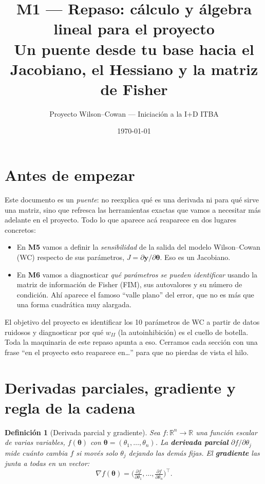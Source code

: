 \documentclass[11pt,a4paper]{article}
\title{\textbf{M1 --- Repaso: cálculo y álgebra lineal para el proyecto}\\[2pt]\large Un puente desde tu base hacia el Jacobiano, el Hessiano y la matriz de Fisher}
\author{Proyecto Wilson--Cowan --- Iniciación a la I+D ITBA}
\date{\today}
\newtheorem{definition}{Definición}
\newcommand{\R}{\mathbb{R}}
\newcommand{\thetavec}{\bm{\theta}}
\newcommand{\transp}{^{\top}}
\begin{document}
\maketitle
\tableofcontents
\bigskip

\section*{Antes de empezar}

Este documento es un \emph{puente}: no reexplica qué es una derivada ni para qué sirve una matriz, sino que refresca las herramientas exactas que vamos a necesitar más adelante en el proyecto. Todo lo que aparece acá reaparece en dos lugares concretos:

\begin{itemize}[nosep]
  \item En \textbf{M5} vamos a definir la \emph{sensibilidad} de la salida del modelo Wilson--Cowan (WC) respecto de sus parámetros, $J=\partial \mathbf{y}/\partial\thetavec$. Eso es un Jacobiano.
  \item En \textbf{M6} vamos a diagnosticar \emph{qué parámetros se pueden identificar} usando la matriz de información de Fisher (FIM), sus autovalores y su número de condición. Ahí aparece el famoso ``valle plano'' del error, que no es más que una forma cuadrática muy alargada.
\end{itemize}

El objetivo del proyecto es identificar los 10 parámetros de WC a partir de datos ruidosos y diagnosticar por qué $w_{II}$ (la autoinhibición) es el cuello de botella. Toda la maquinaria de este repaso apunta a eso. Cerramos cada sección con una frase ``en el proyecto esto reaparece en\dots'' para que no pierdas de vista el hilo.

\section{Derivadas parciales, gradiente y regla de la cadena}

\begin{definition}[Derivada parcial y gradiente]
Sea $f:\R^n\to\R$ una función escalar de varias variables, $f(\thetavec)$ con $\thetavec=(\theta_1,\dots,\theta_n)$. La \textbf{derivada parcial} $\partial f/\partial\theta_j$ mide cuánto cambia $f$ si movés \emph{solo} $\theta_j$ dejando las demás fijas. El \textbf{gradiente} las junta a todas en un vector:
\[
\nabla f(\thetavec)=\Big(\tfrac{\partial f}{\partial\theta_1},\dots,\tfrac{\partial f}{\partial\theta_n}\Big)\transp .
\]
\end{definition}
\end{document}
